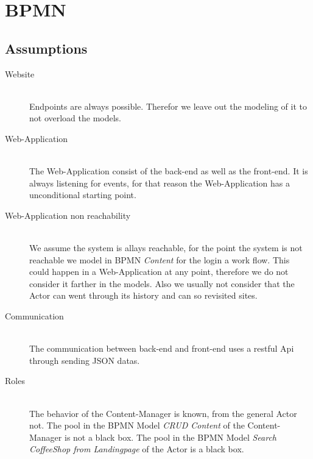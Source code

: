 \newpage
\section{BPMN}

\subsection{Assumptions}
\begin{description}
\item[Website]\hfill \\
Endpoints are always possible. Therefor we leave out the modeling of it to not overload the models.
\item[Web-Application]\hfill \\ 
The Web-Application consist of the back-end as well as the front-end.
It is always listening for events, for that reason the Web-Application has a unconditional starting point.
\item[Web-Application non reachability]\hfill \\
We assume the system is allays reachable, for the point the system is not reachable we model in BPMN \textit{Content} for the login a work flow.
This could happen in a Web-Application at any point, therefore we do not consider it farther in the models. Also we usually not consider that the Actor can went through its history and can so revisited sites.
\item[Communication]\hfill \\ The communication between back-end and front-end uses a restful Api through sending JSON datas. 
\item[Roles]\hfill \\ 
The behavior of the Content-Manager is known, from the general Actor not.
The pool in the BPMN Model \textit{CRUD Content} of the Content-Manager is not a black box. The pool in the BPMN Model \textit{Search  CoffeeShop from Landingpage} of the Actor is a black box.
\end{description}


\newpage
